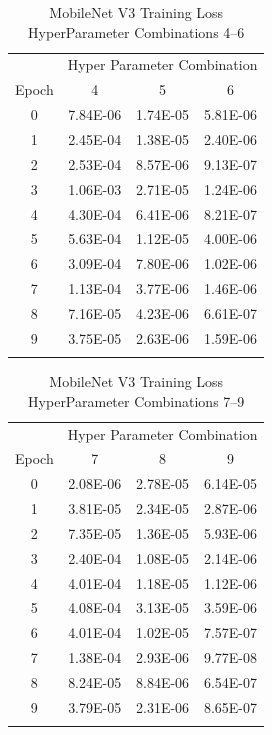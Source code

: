 \documentclass[10pt, conference]{IEEEtran}
\begin{document}
\begin{table}[H]
    \centering
    \begin{tabular}{@{}cccc@{}}
        \toprule
        & \multicolumn{3}{c}{Hyper Parameter Combination} \\
        \cmidrule{2-4}
            Epoch  & 4 & 5 & 6\\
        \midrule

        0 & 7.84E-06 & 1.74E-05 & 5.81E-06 \\
        1 & 2.45E-04 & 1.38E-05 & 2.40E-06 \\
        2 & 2.53E-04 & 8.57E-06 & 9.13E-07 \\
        3 & 1.06E-03 & 2.71E-05 & 1.24E-06 \\
        4 & 4.30E-04 & 6.41E-06 & 8.21E-07 \\
        5 & 5.63E-04 & 1.12E-05 & 4.00E-06 \\
        6 & 3.09E-04 & 7.80E-06 & 1.02E-06 \\
        7 & 1.13E-04 & 3.77E-06 & 1.46E-06 \\
        8 & 7.16E-05 & 4.23E-06 & 6.61E-07 \\
        9 & 3.75E-05 & 2.63E-06 & 1.59E-06 \\

        \bottomrule\smallskip
    \end{tabular}
    \caption{MobileNet V3 Training Loss HyperParameter Combinations 4--6}%
    \label{table:MobileNetV3TrainingLoss4-6}
\end{table}


\begin{table}[H]
    \centering
    \begin{tabular}{@{}cccc@{}}
        \toprule
        & \multicolumn{3}{c}{Hyper Parameter Combination} \\
        \cmidrule{2-4}
            Epoch  & 7 & 8 & 9\\
        \midrule

        0 & 2.08E-06 & 2.78E-05 & 6.14E-05 \\
        1 & 3.81E-05 & 2.34E-05 & 2.87E-06 \\
        2 & 7.35E-05 & 1.36E-05 & 5.93E-06 \\
        3 & 2.40E-04 & 1.08E-05 & 2.14E-06 \\
        4 & 4.01E-04 & 1.18E-05 & 1.12E-06 \\
        5 & 4.08E-04 & 3.13E-05 & 3.59E-06 \\
        6 & 4.01E-04 & 1.02E-05 & 7.57E-07 \\
        7 & 1.38E-04 & 2.93E-06 & 9.77E-08 \\
        8 & 8.24E-05 & 8.84E-06 & 6.54E-07 \\
        9 & 3.79E-05 & 2.31E-06 & 8.65E-07 \\

        \bottomrule\smallskip
    \end{tabular}
    \caption{MobileNet V3 Training Loss HyperParameter Combinations 7--9}%
    \label{table:MobileNetV3TrainingLoss7-9}
\end{table}
\end{document}
